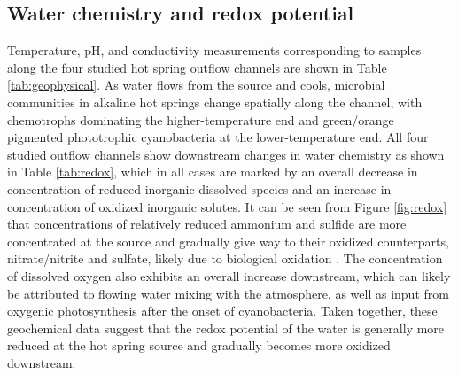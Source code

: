 \subsection{Water chemistry and redox potential} Temperature, pH, and conductivity measurements corresponding to samples along the four studied hot spring outflow channels are shown in Table \ref{tab:geophysical}. As water flows from the source and cools, microbial communities in alkaline hot springs change spatially along the channel, with chemotrophs dominating the higher-temperature end and green/orange pigmented phototrophic cyanobacteria at the lower-temperature end. All four studied outflow channels show downstream changes in water chemistry as shown in Table \ref{tab:redox}, which in all cases are marked by an overall decrease in concentration of reduced inorganic dissolved species and an increase in concentration of oxidized inorganic solutes. It can be seen from Figure \ref{fig:redox} that concentrations of relatively reduced ammonium and sulfide are more concentrated at the source and gradually give way to their oxidized counterparts, nitrate/nitrite and sulfate, likely due to biological oxidation \citep{cox2011transition, loiacono2012evidence}. The concentration of dissolved oxygen also exhibits an overall increase downstream, which can likely be attributed to flowing water mixing with the atmosphere, as well as input from oxygenic photosynthesis after the onset of cyanobacteria. Taken together, these geochemical data suggest that the redox potential of the water is generally more reduced at the hot spring source and gradually becomes more oxidized downstream.







